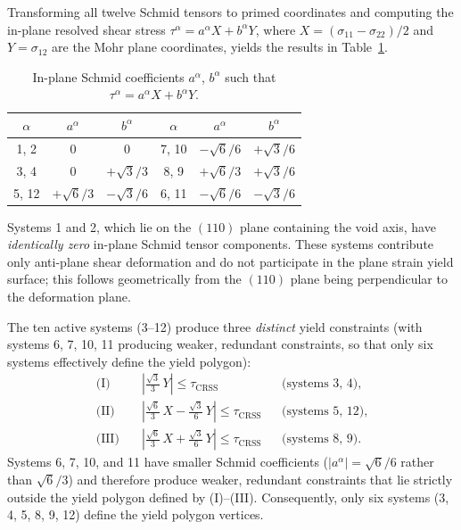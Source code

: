 \documentclass{svjour3} %
\newcommand{\tcrss}{\tau_{\mathrm{CRSS}}}
\begin{document}
Transforming all twelve Schmid tensors to primed coordinates and computing
the in-plane resolved shear stress
$\tau^\alpha = a^\alpha X + b^\alpha Y$, where
$X = (\sigma_{11} - \sigma_{22})/2$ and $Y = \sigma_{12}$ are the Mohr
plane coordinates, yields the results in Table~\ref{tab:schmid2d}.

\begin{table}[htb]
\caption{In-plane Schmid coefficients $a^\alpha$, $b^\alpha$ such that
$\tau^\alpha = a^\alpha X + b^\alpha Y$.}
\label{tab:schmid2d}
\centering
\begin{tabular}{ccc|ccc}
\toprule
$\alpha$ & $a^\alpha$ & $b^\alpha$ &
$\alpha$ & $a^\alpha$ & $b^\alpha$ \\
\midrule
1, 2  & $0$ & $0$ &
7, 10 & $-\sqrt{6}/6$ & $+\sqrt{3}/6$ \\
3, 4  & $0$ & $+\sqrt{3}/3$ &
8, 9  & $+\sqrt{6}/3$ & $+\sqrt{3}/6$ \\
5, 12 & $+\sqrt{6}/3$ & $-\sqrt{3}/6$ &
6, 11 & $-\sqrt{6}/6$ & $-\sqrt{3}/6$ \\
\bottomrule
\end{tabular}
\end{table}

Systems 1 and 2, which lie on the $(110)$ plane containing the void
axis, have \emph{identically zero} in-plane Schmid tensor components.
These systems contribute only anti-plane shear deformation and do not
participate in the plane strain yield surface; this follows
geometrically from the $(110)$ plane being perpendicular to the
deformation plane.

The ten active systems (3--12) produce three \emph{distinct} yield
constraints (with systems 6, 7, 10, 11 producing weaker, redundant
constraints, so that only six systems effectively define the yield
polygon):
\begin{align}
\label{eq:yield_constraints}
\text{(I)} & \quad
  \left\lvert \frac{\sqrt{3}}{3}\,Y \right\rvert \leq \tcrss
  & & \text{(systems 3, 4)}, \\
\text{(II)} & \quad
  \left\lvert \frac{\sqrt{6}}{3}\,X
            - \frac{\sqrt{3}}{6}\,Y \right\rvert \leq \tcrss
  & & \text{(systems 5, 12)}, \\
\text{(III)} & \quad
  \left\lvert \frac{\sqrt{6}}{3}\,X
             + \frac{\sqrt{3}}{6}\,Y \right\rvert \leq \tcrss
  & & \text{(systems 8, 9)}.
\end{align}
Systems 6, 7, 10, and 11 have smaller Schmid coefficients
($|a^\alpha| = \sqrt{6}/6$ rather than $\sqrt{6}/3$) and therefore
produce weaker, redundant constraints that lie strictly outside the
yield polygon defined by (I)--(III). Consequently, only six systems
(3, 4, 5, 8, 9, 12) define the yield polygon vertices.
\end{document}
